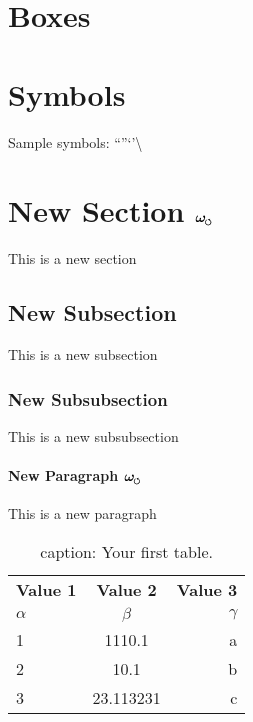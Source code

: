 \documentclass{article}
\newcommand{\swirlarrow}{%
    \mathchoice{\mkern-2mu\scriptstyle\boldsymbol{\circlearrowleft}}%
    {\mkern-2mu\scriptstyle\boldsymbol{\circlearrowleft}}%
    {\mkern-2mu\scriptscriptstyle\boldsymbol{\circlearrowleft}}%
    {\mkern-2mu\scriptscriptstyle\boldsymbol{\circlearrowleft}}%
}
\newcommand{\omegas}{\boldsymbol{\omega}_{\swirlarrow}}  %
\begin{document}
    \section{Boxes}
    \medbreak\noindent{}\smallbreak

    \section{Symbols}
    Sample symbols:
    \noindent \textfractionsolidus \textdiv \texttimes \textminus \textpm \textsurd \textlnot \textasteriskcentered
    \textbullet \textperiodcentered \textdagger \textdaggerdbl \textsection \textparagraph \textbardbl \textellipsis
    \textquotedblleft \textquotedblright \textquoteleft \textquoteright \textbackslash \textbullet \textemdash \textendash


\section{New Section $\omegas\quad$} This is a new section
\subsection{New Subsection} This is a new subsection
\subsubsection{New Subsubsection} This is a new subsubsection
\paragraph{New Paragraph  $\omegas\quad$ } This is a new paragraph



\begin{table}[h!]
  \begin{center}
    \caption{caption: Your first table.}
    \label{tab:table1}
    \begin{tabular}{l|c|r}
      \textbf{Value 1} & \textbf{Value 2} & \textbf{Value 3}\\
      $\alpha$ & $\beta$ & $\gamma$ \\
      \hline
      1 & 1110.1 & a\\
      2 & 10.1 & b\\
      3 & 23.113231 & c\\
    \end{tabular}
  \end{center}
\end{table}
\end{document}
